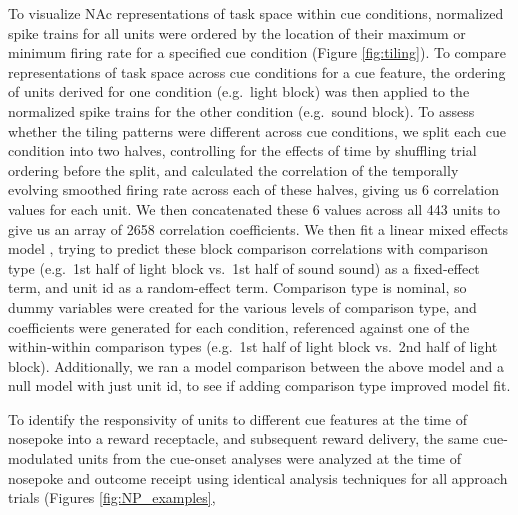 \documentclass[11pt]{article}
\providecommand{\DIFadd}[1]{{\protect\color{red} \sf #1}} %
\providecommand{\DIFdel}[1]{} %
\providecommand{\DIFaddbegin}{} %
\providecommand{\DIFaddend}{} %
\providecommand{\DIFdelbegin}{} %
\providecommand{\DIFdelend}{} %
\newcommand{\DIFscaledelfig}{0.5}
\newlength{\DIFdelgraphicswidth} %
\newlength{\DIFdelgraphicsheight} %
\newcommand{\DIFaddincludegraphics}[2][]{{\color{red}\fbox{\DIFOincludegraphics[#1]{#2}}}} %
\newcommand{\DIFdelincludegraphics}[2][]{%
\sbox{\DIFdelgraphicsbox}{\DIFOincludegraphics[#1]{#2}}%
\settoboxwidth{\DIFdelgraphicswidth}{\DIFdelgraphicsbox} %
\settoboxtotalheight{\DIFdelgraphicsheight}{\DIFdelgraphicsbox} %
\scalebox{\DIFscaledelfig}{%
\parbox[b]{\DIFdelgraphicswidth}{\usebox{\DIFdelgraphicsbox}\\[-\baselineskip] \rule{\DIFdelgraphicswidth}{0em}}\llap{\resizebox{\DIFdelgraphicswidth}{\DIFdelgraphicsheight}{%
\setlength{\unitlength}{\DIFdelgraphicswidth}%
\begin{picture}(1,1)%
\thicklines\linethickness{2pt} %
{\color[rgb]{1,0,0}\put(0,0){\framebox(1,1){}}}%
{\color[rgb]{1,0,0}\put(0,0){\line( 1,1){1}}}%
{\color[rgb]{1,0,0}\put(0,1){\line(1,-1){1}}}%
\end{picture}%
}\hspace*{3pt}}} %
} %
\DeclareRobustCommand{\DIFaddbegin}{\DIFOaddbegin \let\includegraphics\DIFaddincludegraphics} %
\DeclareRobustCommand{\DIFaddend}{\DIFOaddend \let\includegraphics\DIFOincludegraphics} %
\DeclareRobustCommand{\DIFdelbegin}{\DIFOdelbegin \let\includegraphics\DIFdelincludegraphics} %
\DeclareRobustCommand{\DIFdelend}{\DIFOaddend \let\includegraphics\DIFOincludegraphics} %
\begin{document}
\DIFdelend To visualize NAc representations of task space within cue conditions, normalized spike trains for all units were ordered by the location of their maximum or minimum firing rate for a specified cue condition (Figure \ref{fig:tiling}). To compare representations of task space across cue conditions for a cue feature, the ordering of units derived for one condition (e.g.\ light block) was then applied to the normalized spike trains for the other condition (e.g.\ sound block). \DIFdelbegin \DIFdel{For control comparisons within }\DIFdelend \DIFaddbegin \DIFadd{To assess whether the tiling patterns were different across }\DIFaddend cue conditions, \DIFdelbegin \DIFdel{half of the
trials for a condition were compared against the other half. To look
at the correlation of firing rates of all units within and across various cue conditions, trials for each cue condition for a unitwere
shuffled and divided into two averages, and averages within and across cue conditions were correlated. A }\DIFdelend \DIFaddbegin \DIFadd{we split each cue condition into two halves, controlling for the effects of time by shuffling trial ordering before the split, and calculated the correlation of the temporally evolving smoothed firing rate across each of these halves, giving us 6 correlation values for each unit. We then concatenated these 6 values across all 443 units to give us an array of 2658 correlation coefficients. We then fit a }\DIFaddend linear mixed effects model\DIFdelbegin \DIFdel{was run
for each cue conditionto determine if correlations of firing rates
within cue conditions were more similar than correlations across cue
conditions}\DIFdelend \DIFaddbegin \DIFadd{, trying to predict these block comparison correlations with comparison type (e.g.\ 1st half of light block vs.\ 1st half of sound sound) as a fixed-effect term, and unit id as a random-effect term. Comparison type is nominal, so dummy variables were created for the various levels of comparison type, and coefficients were generated for each condition, referenced against one of the within-within comparison types (e.g.\ 1st half of light block vs.\ 2nd half of light block). Additionally, we ran a model comparison between the above model and a null model with just unit id, to see if adding comparison type improved model fit}\DIFaddend .

To identify the responsivity of units to different cue features at the time of \DIFdelbegin \DIFdel{a }\DIFdelend nosepoke into a reward receptacle, and subsequent reward delivery, the same \DIFdelbegin \DIFdel{cue-responsive }\DIFdelend \DIFaddbegin \DIFadd{cue-modulated }\DIFaddend units from the cue-onset analyses were analyzed at the time of nosepoke and outcome receipt using identical analysis techniques \DIFaddbegin \DIFadd{for all approach trials }\DIFaddend (Figures \ref{fig:NP_examples},\DIFdelbegin \DIFdel{\ref{fig:NP_GLM}, \ref{fig:NP_pop}, and \ref{fig:NP_tiling}). }%
\end{document}
